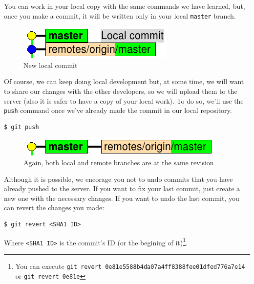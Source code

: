 \documentclass[a4paper,10pt]{article}
\newenvironment{terminal}
  {
    \vspace{+10pt}
    \begin{center}
    \begin{minipage}{0.95\textwidth}
    \begin{framed}
  }
  {
    \end{framed}
    \end{minipage}
    \end{center}
    \vspace{+10pt}
  }
\begin{document}
You can work in your local copy with the same commands we have
learned, but, once you make a commit, it will be written only in your
local \texttt{master} branch.

\begin{figure}[h]
  \begin{center}
    \includegraphics[scale=0.5]{server-01}
  \end{center}
  \caption{New local commit}
\end{figure}

Of course, we can keep doing local development but, at some time, we
will want to share our changes with the other developers, so we will
upload them to the server (also it is safer to have a copy of your
local work). To do so, we'll use the \texttt{push} command once we've
already made the commit in our local repository.

\begin{terminal}
\begin{verbatim}
$ git push
\end{verbatim}
\end{terminal}

\begin{figure}[h]
  \begin{center}
    \includegraphics[scale=0.5]{server-00}
  \end{center}
  \caption{Again, both local and remote branches are at the same revision}
\end{figure}

Although it is possible, we encorage you not to undo commits that you
have already pushed to the server. If you want to fix your last
commit, just create a new one with the necessary changes. If you want
to undo the last commit, you can revert the changes you made:

\begin{terminal}
\begin{verbatim}
$ git revert <SHA1 ID>
\end{verbatim}
\end{terminal}

Where \texttt{<SHA1 ID>} is the commit's ID (or the begining of
it)\footnote{You can execute \texttt{git revert
0e81e5588b4da07a4ff8388fee01dfed776a7e14} or \texttt{git revert 0e81e}}.
\end{document}
